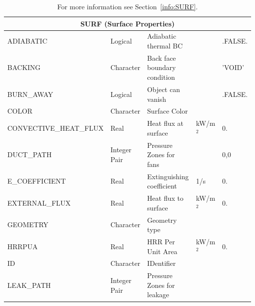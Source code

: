 \documentclass[11pt]{book}
\begin{document}
\begin{longtable}{|l|l|l|l|l|}
\caption[  ]{For more information see Section~\ref{info:SURF}.}
\label{tbl:SURF} \\
\hline
\multicolumn{5}{|c|}{{\ct SURF} (Surface Properties)} \\ \hline \hline
{\ct ADIABATIC}                       & Logical         & Adiabatic thermal BC              &                     & {\ct .FALSE.}           \\ \hline
{\ct BACKING}                         & Character       & Back face boundary condition      &                     & {\ct 'VOID'}            \\ \hline
{\ct BURN\_AWAY}                      & Logical         & Object can vanish                 &                     & {\ct .FALSE.}           \\ \hline
{\ct COLOR    }                       & Character       & Surface Color                     &                     &                         \\ \hline
{\ct CONVECTIVE\_HEAT\_FLUX}          & Real            & Heat flux at surface              & kW/m$^2$            & 0.                      \\ \hline
{\ct DUCT\_PATH}                      & Integer Pair    & Pressure Zones for fans           &                     & 0,0                     \\ \hline
{\ct E\_COEFFICIENT}                  & Real            & Extinguishing coefficient         & 1/s                 & 0.                      \\ \hline
{\ct EXTERNAL\_FLUX}                  & Real            & Heat flux to surface              & kW/m$^2$            & 0.                      \\ \hline
{\ct GEOMETRY}                        & Character       & Geometry type                     &                     &                         \\ \hline
{\ct HRRPUA }                         & Real            & HRR Per Unit Area                 & kW/m$^2$            & 0.                      \\ \hline
{\ct ID     }                         & Character       & IDentifier                        &                     &                         \\ \hline
{\ct LEAK\_PATH}                      & Integer Pair    & Pressure Zones for leakage        &                     &                         \\ \hline

\end{longtable}
\end{document}
